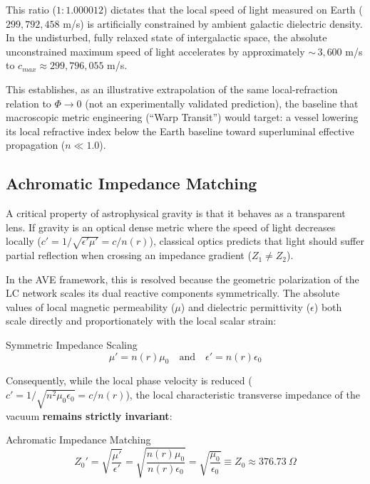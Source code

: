 This ratio ($1{:}1.000012$) dictates that the local speed of light measured on Earth ($299{,}792{,}458$ m/s) is artificially constrained by ambient galactic dielectric density. In the undisturbed, fully relaxed state of intergalactic space, the absolute unconstrained maximum speed of light accelerates by approximately ${\sim}\,3{,}600$ m/s to $c_{max} \approx 299{,}796{,}055$ m/s.

This establishes, as an illustrative extrapolation of the same local-refraction relation to $\Phi \to 0$ (not an experimentally validated prediction), the baseline that macroscopic metric engineering (``Warp Transit'') would target: a vessel lowering its local refractive index below the Earth baseline toward superluminal effective propagation ($n \ll 1.0$).

\subsection{Achromatic Impedance Matching}
\label{sec:achromatic_matching}
A critical property of astrophysical gravity is that it behaves as a transparent lens. If gravity is an optical dense metric where the speed of light decreases locally ($c' = 1/\sqrt{\epsilon' \mu'} = c/n(r)$), classical optics predicts that light should suffer partial reflection when crossing an impedance gradient ($Z_1 \neq Z_2$). 

In the AVE framework, this is resolved because the geometric polarization of the LC network scales its dual reactive components symmetrically. The absolute values of local magnetic permeability ($\mu$) and dielectric permittivity ($\epsilon$) both scale directly and proportionately with the local scalar strain: 
\begin{resultbox}{Symmetric Impedance Scaling}
\begin{equation}
    \mu' = n(r)\mu_0 \quad \text{and} \quad \epsilon' = n(r)\epsilon_0
\end{equation}
\end{resultbox}

Consequently, while the local phase velocity is reduced ($c' = 1/\sqrt{n^2\mu_0 \epsilon_0} = c/n(r)$), the local characteristic transverse impedance of the vacuum \textbf{remains strictly invariant}:
\begin{resultbox}{Achromatic Impedance Matching}
\begin{equation}
    Z_0' = \sqrt{\frac{\mu'}{\epsilon'}} = \sqrt{\frac{n(r)\mu_0}{n(r)\epsilon_0}} = \sqrt{\frac{\mu_0}{\epsilon_0}} \equiv Z_0 \approx 376.73\ \Omega
\end{equation}
\end{resultbox}

